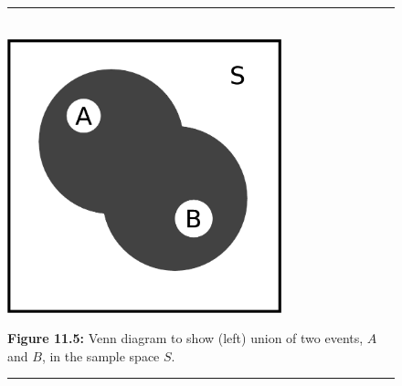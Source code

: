 	\begin{figure}[H] %
    \begin{center}
    \rule[.1in]{\figurerulewidth}{.005in} \\
        \label{m39377*uid13!!!underscore!!!media}\label{m39377*uid13!!!underscore!!!printimage}\includegraphics[width=300px]{col11306.imgs/m39377_union.png} %
        
      \vspace{2pt}
    \vspace{\rubberspace}\par \begin{cnxcaption}
	  \small \textbf{Figure 11.5: }Venn diagram to show (left) union of two events, \begin{math}A\end{math} and \begin{math}B\end{math}, in the sample space \begin{math}S\end{math}.
	\end{cnxcaption}
      
    \vspace{.1in}
    \rule[.1in]{\figurerulewidth}{.005in} \\
        
    \end{center}

 \end{figure}   

    \addtocounter{footnote}{-0}
    

    \setcounter{subfigure}{0}


